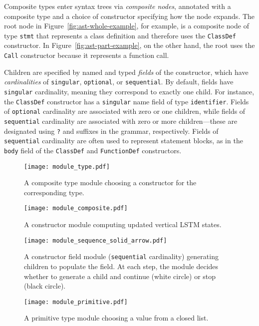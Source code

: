 \documentclass[11pt,a4paper]{article}
\newcommand{\singular}{{\tt singular}\xspace}
\newcommand{\optional}{{\tt optional}\xspace}
\newcommand{\sequential}{{\tt sequential}\xspace}
\begin{document}
Composite types enter syntax trees via {\it composite nodes}, annotated with a composite type and a choice of constructor specifying how the node expands. The root node in Figure~\ref{fig:ast-whole-example}, for example, is a composite node of type \texttt{stmt} that represents a class definition and therefore uses the {\tt ClassDef} constructor. In Figure~\ref{fig:ast-part-example}, on the other hand, the root uses the {\tt Call} constructor because it represents a function call.

Children are specified by named and typed {\it fields} of the constructor, which have {\it cardinalities} of \singular, \optional, or \sequential. By default, fields have \singular cardinality, meaning they correspond to exactly one child. For instance, the {\tt ClassDef} constructor has a \singular name field of type {\tt identifier}. Fields of \optional cardinality are associated with zero or one children, while fields of \sequential cardinality are associated with zero or more children---these are designated using {\tt ?} and {\tt *} suffixes in the grammar, respectively. Fields of \sequential cardinality are often used to represent statement blocks, as in the {\tt body} field of the {\tt ClassDef} and {\tt FunctionDef} constructors.

\begin{figure*}[t]
\centering
\begin{subfigure}{0.45\linewidth}
\centering
\texttt{[image: module\_type.pdf]}
\caption{A composite type module choosing a constructor for the corresponding type.\label{subfig:composite}}
\end{subfigure}\hspace{0.3in}\begin{subfigure}{0.45\linewidth}
\centering
\texttt{[image: module\_composite.pdf]}
\caption{A constructor module computing updated vertical LSTM states.\label{subfig:constructor}}
\end{subfigure}
\begin{subfigure}{0.45\linewidth}
\centering
\texttt{[image: module\_sequence\_solid\_arrow.pdf]}
\caption{A constructor field module (\sequential cardinality) generating children to populate the field. At each step, the module decides whether to generate a child and continue (white circle) or stop (black circle). \label{subfig:sequence}}
\end{subfigure}\hspace{0.3in}\begin{subfigure}{0.45\linewidth}
\centering
\texttt{[image: module\_primitive.pdf]}
\caption{A primitive type module choosing a value from a closed list.\label{subfig:primitive}}
\end{subfigure}
\caption{The module classes constituting our decoder. For brevity, we omit the cardinality modules for \singular and \optional cardinalities.\label{fig:modules}}
\end{figure*}
\end{document}

